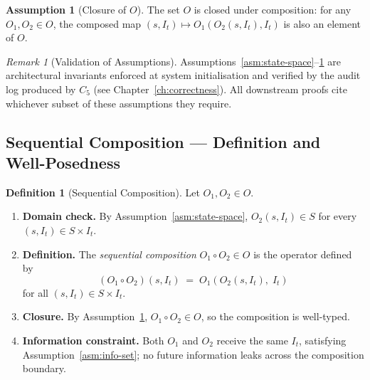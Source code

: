 \documentclass[12pt,openany]{book}
\newcommand{\calI}{\mathcal{I}}
\numberwithin{equation}{chapter}
\theoremstyle{plain}
\theoremstyle{definition}
\newtheorem{definition}[theorem]{Definition}
\newtheorem{assumption}[theorem]{Assumption}
\theoremstyle{remark}
\newtheorem{remark}[theorem]{Remark}
\numberwithin{equation}{chapter}
\theoremstyle{plain}
\newcommand{\calO}{\mathcal{O}}
\newcommand{\calS}{\mathcal{S}}
\def\calI{I}%
\def\calS{S}%
\def\calO{O}%
\begin{document}
\begin{assumption}[Closure of $\calO$]
\label{asm:closure}
The set $\calO$ is closed under composition: for any
$O_1, O_2 \in \calO$, the composed map
$(s, \calI_t) \mapsto O_1(O_2(s, \calI_t), \calI_t)$
is also an element of $\calO$.
\end{assumption}

\begin{remark}[Validation of Assumptions]
Assumptions~\ref{asm:state-space}--\ref{asm:closure} are
architectural invariants enforced at system initialisation and
verified by the audit log produced by $C_5$
(see Chapter~\ref{ch:correctness}).  All downstream proofs
cite whichever subset of these assumptions they require.
\end{remark}

\subsection{Sequential Composition --- Definition and Well-Posedness}
\label{subsec:seq-def}

\begin{definition}[Sequential Composition]
\label{def:seq-composition}
Let $O_1, O_2 \in \calO$.
\begin{enumerate}
  \item \textbf{Domain check.}
        By Assumption~\ref{asm:state-space}, $O_2(s, \calI_t) \in \calS$
        for every $(s, \calI_t) \in \calS \times \calI_t$.
  \item \textbf{Definition.}
        The \emph{sequential composition} $O_1 \circ O_2 \in \calO$ is
        the operator defined by
        \begin{equation}
          (O_1 \circ O_2)(s, \calI_t)
            \;=\; O_1\!\left(O_2(s, \calI_t),\; \calI_t\right)
          \label{eq:seq-comp}
        \end{equation}
        for all $(s, \calI_t) \in \calS \times \calI_t$.
  \item \textbf{Closure.}
        By Assumption~\ref{asm:closure}, $O_1 \circ O_2 \in \calO$,
        so the composition is well-typed.
  \item \textbf{Information constraint.}
        Both $O_1$ and $O_2$ receive the same $\calI_t$, satisfying
        Assumption~\ref{asm:info-set}; no future information leaks
        across the composition boundary.
\end{enumerate}
\end{definition}
\end{document}
